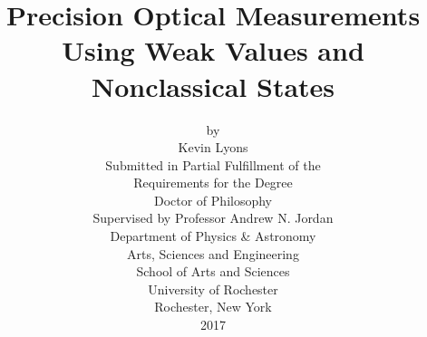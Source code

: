 \thispagestyle{plain}
\begin{titlepage}

  \title{{\boldmath Precision Optical Measurements Using Weak Values and Nonclassical States}}

  \author{
    by\\[0.3cm]
    Kevin Lyons\\[0.8cm]
    {Submitted in Partial Fulfillment of the }\\[0.3cm]
    {Requirements for the Degree}\\[0.3cm]
    {Doctor of Philosophy}\\[0.8cm]
    Supervised by Professor Andrew N. Jordan\\[0.8cm]
    Department of Physics \& Astronomy\\[0.3cm]
    Arts, Sciences and Engineering \\[0.3cm]
    School of Arts and Sciences\\[0.8cm]
    University of Rochester\\[0.3cm]
    Rochester, New York\\[0.3cm]
    2017
  }
\date{}

\maketitle
\thispagestyle{empty}

\end{titlepage}
